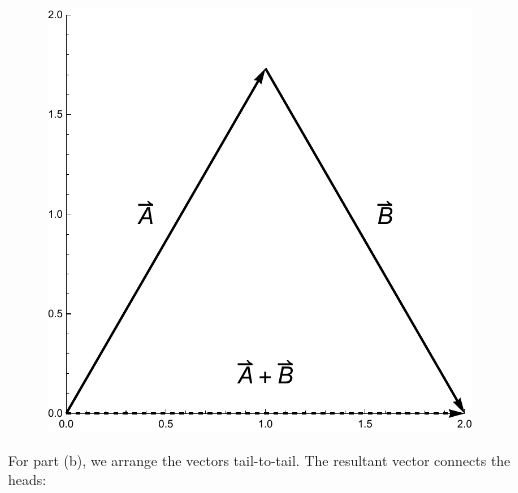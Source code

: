 \documentclass{amsart}
\begin{document}
\begin{figure}[h]
\includegraphics[scale=0.32]{1-22b}
\end{figure}

\clearpage

For part (b), we arrange the vectors tail-to-tail.
The resultant vector connects the heads:
\end{document}
